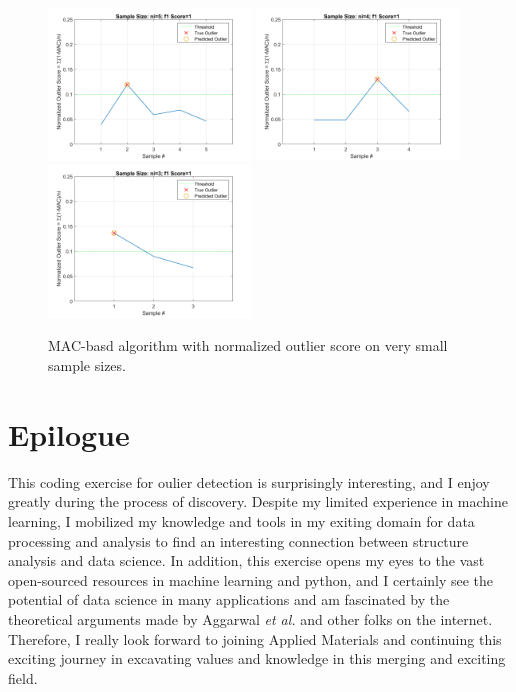 \documentclass[12pt]{article}
\begin{document}
\begin{figure}[ht!]
\centering
\includegraphics[width=0.48\textwidth]{f1score_ni5}
\includegraphics[width=0.48\textwidth]{f1score_ni4}
\includegraphics[width=0.48\textwidth]{f1score_ni3}
\caption{MAC-basd algorithm with normalized outlier score on very small sample sizes.}
\label{fig:fig13}
\end{figure}

\pagebreak
\section{Epilogue}

This coding exercise for oulier detection is surprisingly interesting, and I enjoy greatly 
during the process of discovery. Despite my limited experience in machine learning, I mobilized my 
knowledge and tools in my exiting domain for data processing and analysis to find an interesting 
connection between structure analysis and data science. In addition, this exercise opens my eyes to 
the vast open-sourced resources in machine learning and python, and I certainly
see the potential of data science in many applications and am fascinated by the theoretical arguments
made by Aggarwal \textit{et al.} and other folks on the internet. Therefore, I really look forward to
joining Applied Materials and continuing this exciting journey in excavating values and knowledge in
this merging and exciting field.
\end{document}
